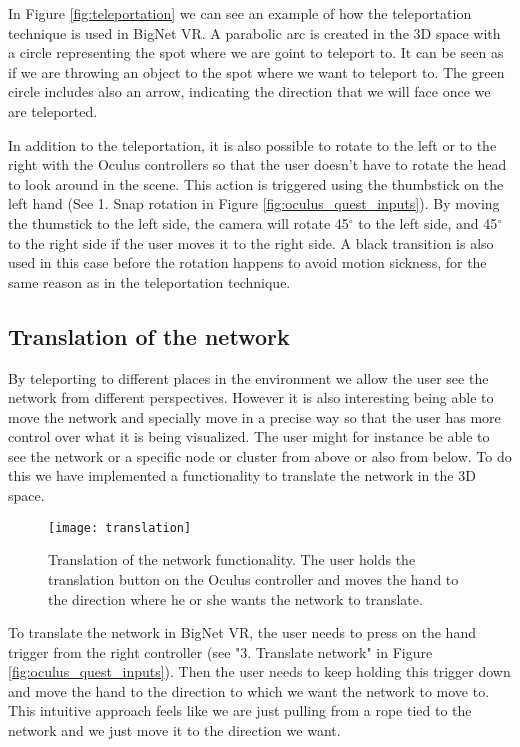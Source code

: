 In Figure \ref{fig:teleportation} we can see an example of how the teleportation technique is used in BigNet VR. A  parabolic arc is created in the 3D space with a circle representing the spot where we are goint to teleport to. It can be seen as if we are throwing an object to the spot where we want to teleport to. The green circle includes also an arrow, indicating the direction that we will face once we are teleported.

In addition to the teleportation, it is also possible to rotate to the left or to the right with the Oculus controllers so that the user doesn't have to rotate the head to look around in the scene. This action is triggered using the thumbstick on the left hand (See 1. Snap rotation in Figure \ref{fig:oculus_quest_inputs}). By moving the thumstick to the left side, the camera will rotate 45$^{\circ}$ to the left side, and 45$^{\circ}$ to the right side if the user moves it to the right side. A black transition is also used in this case before the rotation happens to avoid motion sickness, for the same reason as in the teleportation technique.

\subsection{Translation of the network}
By teleporting to different places in the environment we allow the user see the network from different perspectives. However it is also interesting being able to move the network and specially move in a precise way so that the user has more control over what it is being visualized. The user might for instance be able to see the network or a specific node or cluster from above or also from below. To do this we have implemented a functionality to translate the network in the 3D space.

\begin{figure}[h!]
    \centering%
    \texttt{[image: translation]}
    \caption{Translation of the network functionality. The user holds the translation button on the Oculus controller and moves the hand to the direction where he or she wants the network to translate.}
    \label{fig:translation}
\end{figure}%

To translate the network in BigNet VR, the user needs to press on the hand trigger from the right controller (see "3. Translate network" in Figure \ref{fig:oculus_quest_inputs}). Then the user needs to keep holding this trigger down and move the hand to the direction to which we want the network to move to. This intuitive approach feels like we are just pulling from a rope tied to the network and we just move it to the direction we want.



